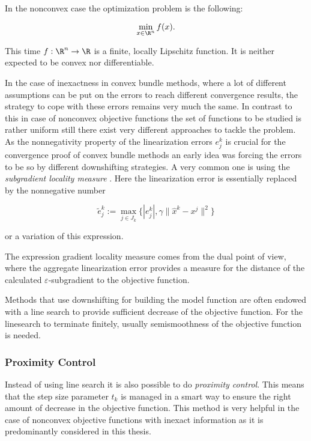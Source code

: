 In the nonconvex case the optimization problem is the following:

\begin{equation}
	\min_{x \in \R^n} f(x).
\label{opt_prob_nonconv}
\end{equation}

This time \(f:\R^n \to \R\) is a finite, locally Lipschitz  function. It is neither expected to be convex nor differentiable.

In the case of inexactness in convex bundle methods, where a lot of different assumptions can be put on the errors to reach different convergence results, the strategy to cope with these errors remains very much the same. In contrast to this in case of nonconvex objective functions the set of functions to be studied is rather uniform still there exist very different approaches to tackle the problem.
As the nonnegativity property of the linearization errors \(e_j^k\) is crucial for the convergence proof of convex bundle methods an early idea was forcing the errors to be so by different downshifting strategies. A very common one is using the \emph{subgradient locality measure} \cite{Kiwiel1986, Mifflin1982}. Here the linearization error is essentially replaced by the nonnegative number

\begin{equation*}
	\tilde{e}_j^k := \max_{j \in J_k} \{|e_j^k|,\gamma \|\hat{x}^k-x^j\|^2\}
\label{subgr_loc_measure}
\end{equation*}

or a variation of this expression.

The expression gradient locality measure comes from the dual point of view, where the aggregate linearization error provides a measure for the distance of the calculated \(\varepsilon\)-subgradient to the objective function.

Methods that use downshifting for building the model function are often endowed with a line search to provide sufficient decrease of the objective function. For the linesearch to terminate finitely, usually semismoothness of the objective function is needed.

\subsubsection{Proximity Control}

Instead of using line search it is also possible to do \emph{proximity control}. This means that the step size parameter \(t_k\) is managed in a smart way to ensure the right amount of decrease in the objective function. This method is very helpful in the case of nonconvex objective functions with inexact information as it is predominantly considered in this thesis.


